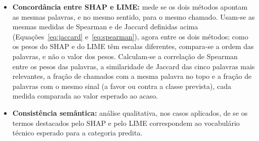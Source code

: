 \documentclass[
    12pt,                %
    openright,           %
    oneside,             %
    a4paper,             %
    english,             %
    brazil               %
]{abntex2}
\begin{document}
\begin{itemize}
\begin{equation}
J(A,B) = \frac{|A \cap B|}{|A \cup B|}
\label{eq:jaccard}
\end{equation}
A segunda é a correlação de Spearman entre os pesos de todas as palavras nas duas repetições, que compara a ordem de importância das palavras e vai de $-1$ (ordens opostas) a 1 (mesma ordem), com 0 indicando ausência de relação:

\begin{equation}
\rho = \frac{\sum_{i=1}^{n} \big(R_i^{a} - \bar{R}^{a}\big)\big(R_i^{b} - \bar{R}^{b}\big)}
{\sqrt{\sum_{i=1}^{n} \big(R_i^{a} - \bar{R}^{a}\big)^2}\;\sqrt{\sum_{i=1}^{n} \big(R_i^{b} - \bar{R}^{b}\big)^2}}
\label{eq:spearman}
\end{equation}
em que $R_i^{a}$ e $R_i^{b}$ são as posições da palavra $i$ nas duas ordenações, e $\bar{R}^{a}$ e $\bar{R}^{b}$, suas médias. A terceira é a fração dos pares de repetições em que a palavra de maior peso é a mesma. A estabilidade de um chamado, com $R = 5$ repetições, é a média da medida sobre todos os pares de repetições; para o Jaccard:

\begin{equation}
\bar{J} = \frac{2}{R(R-1)} \sum_{r < s} J\big(A^{(r)}, A^{(s)}\big)
\label{eq:estabilidade}
\end{equation}
O Jaccard e a palavra do topo são comparados ao valor esperado ao acaso, pois em chamados com poucas palavras a sobreposição é alta mesmo sem estabilidade nenhuma. Se as $n$ palavras fossem ordenadas ao acaso, a chance de duas ordenações terem a mesma palavra no topo seria $1/n$, e o Spearman esperado seria 0.
  \item \textbf{Concordância entre SHAP e LIME:} mede se os dois métodos apontam as mesmas palavras, e no mesmo sentido, para o mesmo chamado. Usam-se as mesmas medidas de Spearman e de Jaccard definidas acima (Equações~\ref{eq:jaccard} e~\ref{eq:spearman}), agora entre os dois métodos; como os pesos do SHAP e do LIME têm escalas diferentes, compara-se a ordem das palavras, e não o valor dos pesos. Calculam-se a correlação de Spearman entre os pesos das palavras, a similaridade de Jaccard das cinco palavras mais relevantes, a fração de chamados com a mesma palavra no topo e a fração de palavras com o mesmo sinal (a favor ou contra a classe prevista), cada medida comparada ao valor esperado ao acaso.
  \item \textbf{Consistência semântica:} análise qualitativa, nos casos aplicados, de se os termos destacados pelo SHAP e pelo LIME correspondem ao vocabulário técnico esperado para a categoria predita.
\end{itemize}
\end{document}
